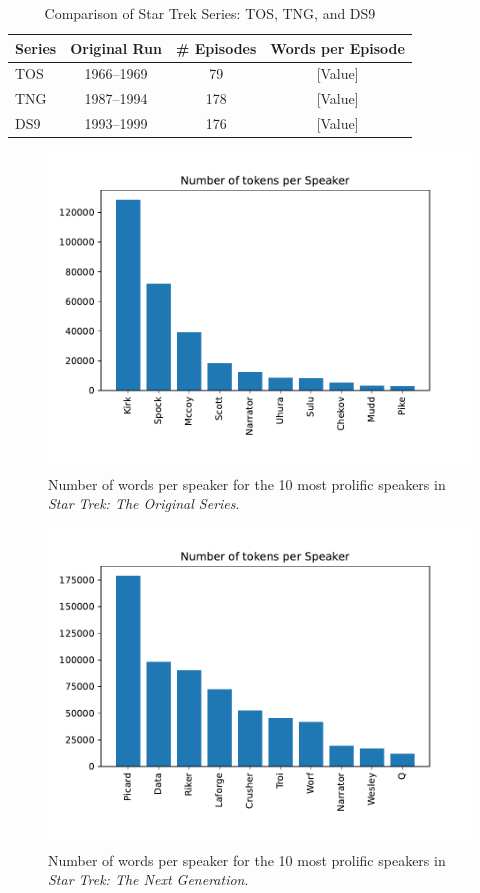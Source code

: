 \begin{table}
\centering
\begin{tabular}{l|c|c|c}
Series & Original Run & \# Episodes & Words per Episode \\
\hline
TOS & 1966--1969 & 79 & [Value] \\
TNG & 1987--1994 & 178 & [Value] \\
DS9 & 1993--1999 & 176 & [Value] \\
\end{tabular}
\caption{Comparison of Star Trek Series: TOS, TNG, and DS9}
\label{table:series-comparison}
\end{table}

\begin{figure}
  \centering
  \includegraphics[width=\columnwidth]{figures/localized/tos_group_sizes.pdf}
  \caption{Number of words per speaker for the 10 most prolific speakers in \textit{Star Trek: The Original Series}.}
  \label{fig:tos_group_sizes}
\end{figure}

\begin{figure}
  \centering
  \includegraphics[width=\columnwidth]{figures/localized/tng_group_sizes.pdf}
  \caption{Number of words per speaker for the 10 most prolific speakers in \textit{Star Trek: The Next Generation}.}
  \label{fig:tng_group_sizes}
\end{figure}

